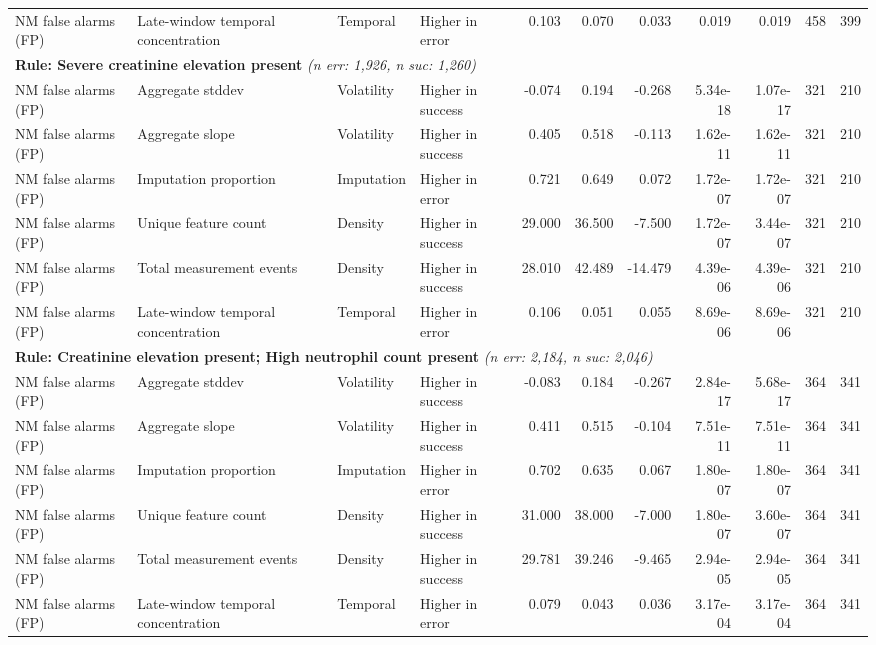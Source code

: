 \documentclass[border=0pt]{standalone}
\begin{document}
\begin{adjustbox}{width=\textwidth}
\begin{tabular}{@{}llllrrrrrrr@{}}
NM false alarms (FP) & Late-window temporal concentration & Temporal & Higher in error & 0.103 & 0.070 & 0.033 & 0.019 & 0.019 & 458 & 399 \\
\multicolumn{11}{l}{\textbf{Rule: Severe creatinine elevation present} \textit{(n err: 1,926, n suc: 1,260)}} \\
NM false alarms (FP) & Aggregate stddev & Volatility & Higher in success & -0.074 & 0.194 & -0.268 & 5.34e-18 & 1.07e-17 & 321 & 210 \\
NM false alarms (FP) & Aggregate slope & Volatility & Higher in success & 0.405 & 0.518 & -0.113 & 1.62e-11 & 1.62e-11 & 321 & 210 \\
NM false alarms (FP) & Imputation proportion & Imputation & Higher in error & 0.721 & 0.649 & 0.072 & 1.72e-07 & 1.72e-07 & 321 & 210 \\
NM false alarms (FP) & Unique feature count & Density & Higher in success & 29.000 & 36.500 & -7.500 & 1.72e-07 & 3.44e-07 & 321 & 210 \\
NM false alarms (FP) & Total measurement events & Density & Higher in success & 28.010 & 42.489 & -14.479 & 4.39e-06 & 4.39e-06 & 321 & 210 \\
NM false alarms (FP) & Late-window temporal concentration & Temporal & Higher in error & 0.106 & 0.051 & 0.055 & 8.69e-06 & 8.69e-06 & 321 & 210 \\
\multicolumn{11}{l}{\textbf{Rule: Creatinine elevation present; High neutrophil count present} \textit{(n err: 2,184, n suc: 2,046)}} \\
NM false alarms (FP) & Aggregate stddev & Volatility & Higher in success & -0.083 & 0.184 & -0.267 & 2.84e-17 & 5.68e-17 & 364 & 341 \\
NM false alarms (FP) & Aggregate slope & Volatility & Higher in success & 0.411 & 0.515 & -0.104 & 7.51e-11 & 7.51e-11 & 364 & 341 \\
NM false alarms (FP) & Imputation proportion & Imputation & Higher in error & 0.702 & 0.635 & 0.067 & 1.80e-07 & 1.80e-07 & 364 & 341 \\
NM false alarms (FP) & Unique feature count & Density & Higher in success & 31.000 & 38.000 & -7.000 & 1.80e-07 & 3.60e-07 & 364 & 341 \\
NM false alarms (FP) & Total measurement events & Density & Higher in success & 29.781 & 39.246 & -9.465 & 2.94e-05 & 2.94e-05 & 364 & 341 \\
NM false alarms (FP) & Late-window temporal concentration & Temporal & Higher in error & 0.079 & 0.043 & 0.036 & 3.17e-04 & 3.17e-04 & 364 & 341 \\

\end{tabular}
\end{adjustbox}
\end{document}

